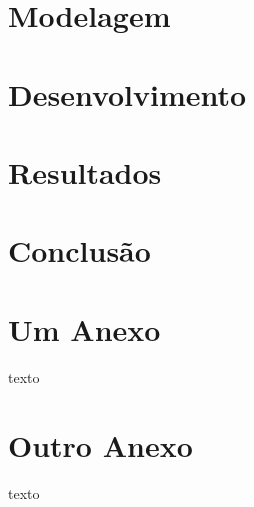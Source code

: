 \documentclass[tcc,capa]{texufpel}
\begin{document}

\chapter{Modelagem}


\chapter{Desenvolvimento}


\chapter{Resultados}


\chapter{Conclusão}




 

%

\annex
\chapter{Um Anexo}

texto

\chapter{Outro Anexo}

texto
\end{document}
